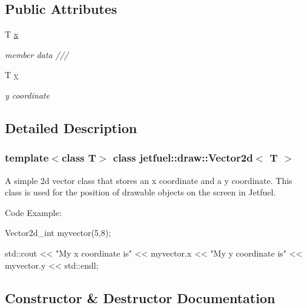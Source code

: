 \subsection*{Public Attributes}
\begin{DoxyCompactItemize}
\item 
T \hyperlink{classjetfuel_1_1draw_1_1Vector2d_a1d0f2b544d0e746ca64b9c431fd4c8f1}{x}
\begin{DoxyCompactList}\small\item\em member data /// \end{DoxyCompactList}\item 
\mbox{\label{classjetfuel_1_1draw_1_1Vector2d_ae826e7bcc14c0095c2a115ef801386ec}} 
T \hyperlink{classjetfuel_1_1draw_1_1Vector2d_ae826e7bcc14c0095c2a115ef801386ec}{y}
\begin{DoxyCompactList}\small\item\em y coordinate \end{DoxyCompactList}\end{DoxyCompactItemize}


\subsection{Detailed Description}
\subsubsection*{template$<$class T$>$\newline
class jetfuel\+::draw\+::\+Vector2d$<$ T $>$}

A simple 2d vector class that stores an x coordinate and a y coordinate. This class is used for the position of drawable objects on the screen in Jetfuel.

Code Example\+: 
\begin{DoxyCode}
Vector2d\_int myvector(5,8);

std::cout << \textcolor{stringliteral}{"My x coordinate is"} << myvector.x <<
             \textcolor{stringliteral}{"My y coordinate is"} << myvector.y <<
std::endl;
\end{DoxyCode}
 

\subsection{Constructor \& Destructor Documentation}
\mbox{\label{classjetfuel_1_1draw_1_1Vector2d_a99950184603c690d3f73753ff3a6500a}} 
